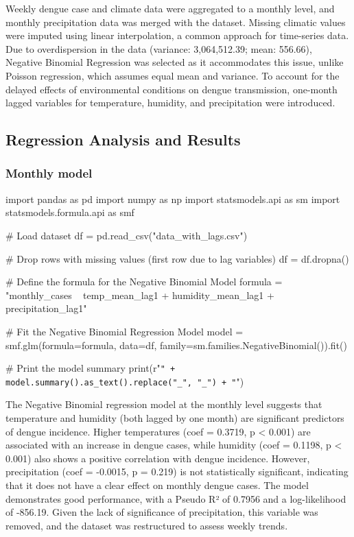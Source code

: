 \documentclass{article}
\begin{document}
Weekly dengue case and climate data were aggregated to a monthly level, and monthly precipitation data was merged with the dataset. Missing climatic values were imputed using linear interpolation, a common approach for time-series data. Due to overdispersion in the data (variance: 3,064,512.39; mean: 556.66), Negative Binomial Regression was selected as it accommodates this issue, unlike Poisson regression, which assumes equal mean and variance. To account for the delayed effects of environmental conditions on dengue transmission, one-month lagged variables for temperature, humidity, and precipitation were introduced.


\subsection*{Regression Analysis and Results}

\subsubsection*{Monthly model}

\begin{pycode}
import pandas as pd
import numpy as np
import statsmodels.api as sm
import statsmodels.formula.api as smf

# Load dataset
df = pd.read_csv("data_with_lags.csv") 

# Drop rows with missing values (first row due to lag variables)
df = df.dropna()

# Define the formula for the Negative Binomial Model
formula = "monthly_cases ~ temp_mean_lag1 + humidity_mean_lag1 + precipitation_lag1"

# Fit the Negative Binomial Regression Model
model = smf.glm(formula=formula, data=df, family=sm.families.NegativeBinomial()).fit()

# Print the model summary
print(r"\texttt{" + model.summary().as_text().replace("_", "\_") + "}")

\end{pycode}

The Negative Binomial regression model at the monthly level suggests that temperature and humidity (both lagged by one month) are significant predictors of dengue incidence. Higher temperatures (coef = 0.3719, p < 0.001) are associated with an increase in dengue cases, while humidity (coef = 0.1198, p < 0.001) also shows a positive correlation with dengue incidence. However, precipitation (coef = -0.0015, p = 0.219) is not statistically significant, indicating that it does not have a clear effect on monthly dengue cases. The model demonstrates good performance, with a Pseudo R² of 0.7956 and a log-likelihood of -856.19. Given the lack of significance of precipitation, this variable was removed, and the dataset was restructured to assess weekly trends.
\end{document}
